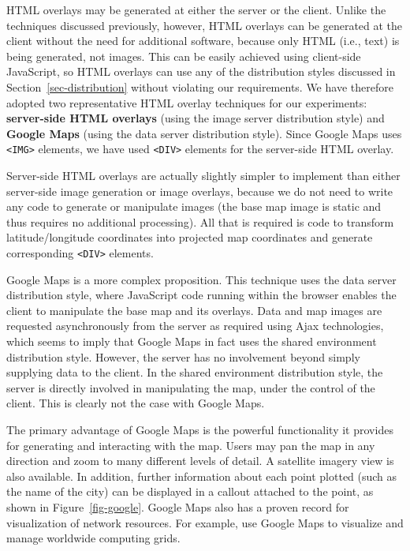 \documentclass[acmnow]{acmtrans2m}
\begin{document}
HTML overlays may be generated at either the server or the client.
Unlike the techniques discussed previously, however, HTML overlays can
be generated at the client without the need for additional software,
because only HTML (i.e., text) is being generated, not images. This can
be easily achieved using client-side JavaScript, so HTML overlays can
use any of the distribution styles discussed in
Section~\ref{sec-distribution} without violating our requirements. We
have therefore adopted two representative HTML overlay techniques for
our experiments: \textbf{server-side HTML overlays} (using the image
server distribution style) and \textbf{Google Maps} (using the data
server distribution style). Since Google Maps uses \verb|<IMG>|
elements, we have used \verb|<DIV>| elements for the server-side HTML
overlay.

Server-side HTML overlays are actually slightly simpler to implement
than either server-side image generation or image overlays, because we
do not need to write any code to generate or manipulate images (the base
map image is static and thus requires no additional processing). All
that is required is code to transform latitude/longitude coordinates
into projected map coordinates and generate corresponding \verb|<DIV>|
elements.

Google Maps \cite{Goog-M-2006-maps} is a more complex proposition. This
technique uses the data server distribution style, where JavaScript code
running within the browser enables the client to manipulate the base map
and its overlays. Data and map images are requested asynchronously from
the server as required using Ajax technologies, which seems to imply
that Google Maps in fact uses the shared environment distribution style.
However, the server has no involvement beyond simply supplying data to
the client. In the shared environment distribution style, the server is
directly involved in manipulating the map, under the control of the
client. This is clearly not the case with Google Maps.

The primary advantage of Google Maps is the powerful functionality it
provides for generating and interacting with the map. Users may pan the
map in any direction and zoom to many different levels of detail. A
satellite imagery view is also available. In addition, further
information about each point plotted (such as the name of the city) can
be displayed in a callout attached to the point, as shown in
Figure~\ref{fig-google}. Google Maps also has a proven record for
visualization of network resources. For example,
 use Google Maps to visualize and manage
worldwide computing grids.
\end{document}
